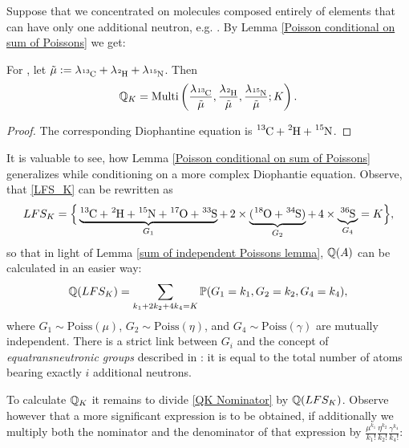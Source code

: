 Suppose that we concentrated on molecules composed entirely of elements that can have only one additional neutron, e.g. \smallMolecule. By Lemma \ref{Poisson conditional on sum of Poissons} we get:

\begin{result}\label{Multinomial Result}
 	For \smallMolecule, let $\tilde{\mu} := \lambda_\cem{^{13}C} + \lambda_\cem{^{2}H} + \lambda_\cem{^{15}N}$. Then
 	$$\QK = \mathrm{Multi}\left(
 		\frac{\lambda_\cem{^{13}C}}{\tilde{\mu}}, 
 		\frac{\lambda_\cem{^{2}H}}{\tilde{\mu}}, 
 		\frac{\lambda_\cem{^{15}N}}{\tilde{\mu}}; K \right).$$
\end{result}

\begin{proof}
	The corresponding Diophantine equation is $\cem{^{13}C} + \cem{^2H} + \cem{^{15}N}$.
\end{proof}

It is valuable to see, how Lemma \ref{Poisson conditional on sum of Poissons} generalizes while conditioning on a more complex Diophantie equation. Observe, that \eqref{LFS_K} can be rewritten as 
\begin{equation*}
	LFS_K = \Big\{ \underbrace{\cem{^{13}C} + \cem{^2H} + \cem{^{15}N} + \cem{^{17}O} + \cem{^{33}S}}_{ G_1 } + \,2 \times \underbrace{( \cem{^{18}O} + \cem{^{34}S} )}_{ G_2 } + \,4 \times \underbrace{\cem{^{36}S}}_{ G_4 } = K \Big\},	
\end{equation*}
so that in light of Lemma \ref{sum of independent Poissons lemma}, $\mathbb{Q}(A)$ can be calculated in an easier way: 
$$\mathbb{Q}( LFS_K ) = \sum_{k_1 + 2 k_2 + 4 k_4 = K} \mathbb{P}( G_1 = k_1, G_2 = k_2, G_4 = k_4 ),$$
where $G_1 \sim \mathrm{Poiss}( \mu )$, $G_2 \sim \mathrm{Poiss}( \eta )$, and $G_4 \sim \mathrm{Poiss}( \gamma )$ are mutually independent. There is a strict link between $G_i$ and the concept of {\it equatransneutronic groups} described in \cite{Olson2009Calculations}: it is equal to the total number of atoms bearing exactly $i$ additional neutrons.  

To calculate $\mathbb{Q}_K$ it remains to divide \eqref{QK Nominator} by $\mathbb{Q}( LFS_K )$. Observe however that a more significant expression is to be obtained, if additionally we multiply both the nominator and the denominator of that expression by $\frac{\mu^{k_1}}{k_1 !} \frac{\eta^{k_2}}{k_2 !} \frac{\gamma^{k_4}}{k_4 !}$:


